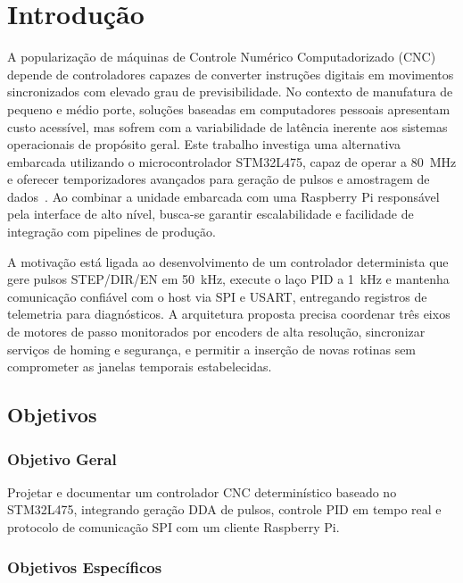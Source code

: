 \chapter{Introdução}\label{cap:introducao}

A popularização de máquinas de Controle Numérico Computadorizado (CNC)
depende de controladores capazes de converter instruções digitais em
movimentos sincronizados com elevado grau de previsibilidade. No
contexto de manufatura de pequeno e médio porte, soluções baseadas em
computadores pessoais apresentam custo acessível, mas sofrem com a
variabilidade de latência inerente aos sistemas operacionais de propósito
geral. Este trabalho investiga uma alternativa embarcada utilizando o
microcontrolador STM32L475, capaz de operar a \SI{80}{\mega\hertz} e
oferecer temporizadores avançados para geração de pulsos e amostragem de
dados~\cite{st_an4013}. Ao combinar a unidade embarcada com uma
Raspberry Pi responsável pela interface de alto nível, busca-se garantir
escalabilidade e facilidade de integração com pipelines de produção.

A motivação está ligada ao desenvolvimento de um controlador determinista
que gere pulsos STEP/DIR/EN em \SI{50}{\kilo\hertz}, execute o laço
PID a \SI{1}{\kilo\hertz} e mantenha comunicação confiável com o host
via SPI e USART, entregando registros de telemetria para diagnósticos. A
arquitetura proposta precisa coordenar três eixos de motores de passo
monitorados por encoders de alta resolução, sincronizar serviços de
homing e segurança, e permitir a inserção de novas rotinas sem
comprometer as janelas temporais estabelecidas.

\section{Objetivos}\label{sec:objetivos}

\subsection{Objetivo Geral}

Projetar e documentar um controlador CNC determinístico baseado no
STM32L475, integrando geração DDA de pulsos, controle PID em tempo real e
protocolo de comunicação SPI com um cliente Raspberry Pi.

\subsection{Objetivos Específicos}

